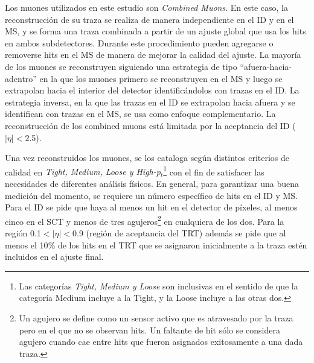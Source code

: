 Los muones utilizados en este estudio son \textit{Combined Muons}. En este caso, la reconstrucción de su traza se realiza de manera independiente en el ID y en el MS, y se forma una traza combinada a partir de un ajuste global que usa los hits en ambos subdetectores. Durante este procedimiento pueden agregarse o removerse hits en el MS de manera de mejorar la calidad del ajuste. La mayoría de los muones se reconstruyen siguiendo una estrategia de tipo ``afuera-hacia-adentro'' en la que los muones primero se reconstruyen en el MS y luego se extrapolan hacia el interior del detector identificándolos con trazas en el ID. La estrategia inversa, en la que las trazas en el ID se extrapolan hacia afuera y se identifican con trazas en el MS, se usa como enfoque complementario. La reconstrucción de los combined muons está limitada por la aceptancia del ID ($|\eta|<$2.5). 

Una vez reconstruidos los muones, se los cataloga según distintos criterios de calidad en \textit{Tight, Medium, Loose y High-p$_t$}\footnote{Las categorías \textit{Tight, Medium y Loose} son inclusivas en el sentido de que la categoría Medium incluye a la Tight, y la Loose incluye a las otras dos.} con el fin de satisfacer las necesidades de diferentes análisis físicos\cite{MuonReco}. En general, para garantizar una buena medición del momento, se requiere un número específico de hits en el ID y MS. Para el ID se pide que haya al menos un hit en el detector de píxeles, al menos cinco en el SCT y menos de tres agujeros\footnote{Un agujero se define como un sensor activo que es atravesado por la traza pero en el que no se observan hits. Un faltante de hit sólo se considera agujero cuando cae entre hits que fueron asignados exitosamente a una dada traza.} en cualquiera de los dos. Para la región 0.1$<|\eta|<$0.9 (región de aceptancia del TRT) además se pide que al menos el 10$\%$ de los hits en el TRT que se asignaron inicialmente a la traza estén incluidos en el ajuste final. 

